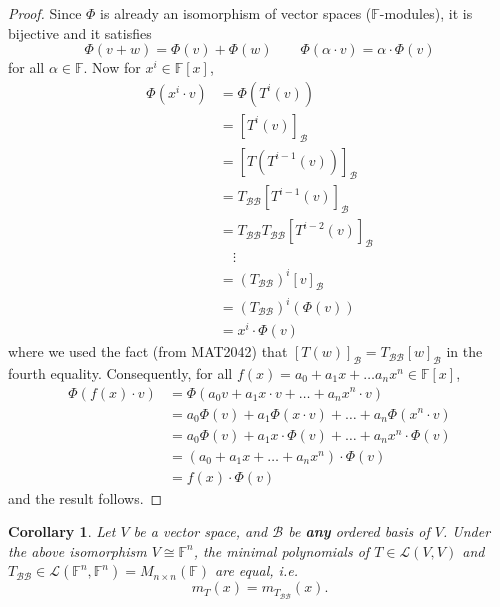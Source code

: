 \documentclass[12pt]{amsbook}
\newtheorem{corollary}[theorem]{Corollary}
\begin{document}
\begin{proof}
    Since $\Phi$ is already an isomorphism of vector spaces ($\mathbb{F}$-modules), it is bijective and it satisfies
    $$\Phi(v + w) = \Phi(v) + \Phi(w) \quad \quad \Phi(\alpha \cdot v) = \alpha \cdot \Phi(v)$$
    for all $\alpha \in \mathbb{F}$. Now for $x^i \in \mathbb{F}[x]$,
    \begin{align*}
    \Phi(x^i \cdot v) &= \Phi (T^i(v)) \\
    &= [T^{i}(v)]_{\mathcal{B}} \\
    &= [T(T^{i-1}(v))]_{\mathcal{B}} \\ 
    &= T_{\mathcal{B}\mathcal{B}}[T^{i-1}(v)]_{\mathcal{B}} \\
    &= T_{\mathcal{B}\mathcal{B}}T_{\mathcal{B}\mathcal{B}}[T^{i-2}(v)]_{\mathcal{B}} \\
    & \quad \vdots \\
    &= (T_{\mathcal{B}\mathcal{B}})^i[v]_{\mathcal{B}} \\
    &= (T_{\mathcal{B}\mathcal{B}})^i(\Phi(v)) \\
    &= x^i \cdot \Phi(v)
    \end{align*}
where we used the fact (from MAT2042) that $[T(w)]_{\mathcal{B}} = T_{\mathcal{B}\mathcal{B}}[w]_{\mathcal{B}}$ in the fourth equality. Consequently, for all $f(x) = a_0 + a_1x + \dots a_nx^n \in \mathbb{F}[x]$,
    \begin{align*}
    \Phi(f(x) \cdot v) &= \Phi (a_0v + a_1x \cdot v + \dots + a_nx^n \cdot v) \\
    &= a_0\Phi (v) + a_1\Phi(x \cdot v) + \dots + a_n\Phi(x^n \cdot v) \\
    &= a_0\Phi (v) + a_1x \cdot \Phi(v) + \dots + a_nx^n \cdot \Phi(v) \\
    &= (a_0+ a_1x + \dots + a_nx^n) \cdot \Phi(v) \\
    &= f(x) \cdot \Phi(v)
    \end{align*}
and the result follows.  
\end{proof}

\begin{corollary}
    Let $V$ be a vector space, and $\mathcal{B}$ be {\bf any} ordered basis of $V$. Under the above isomorphism $V \cong \mathbb{F}^n$, the minimal polynomials of $T \in \mathcal{L}(V,V)$ and $T_{\mathcal{B}\mathcal{B}} \in \mathcal{L}(\mathbb{F}^n, \mathbb{F}^n) = M_{n \times n}(\mathbb{F})$ are equal, i.e.
    $$m_T(x) = m_{T_{\mathcal{B}\mathcal{B}}}(x).$$
\end{corollary}
\end{document}
